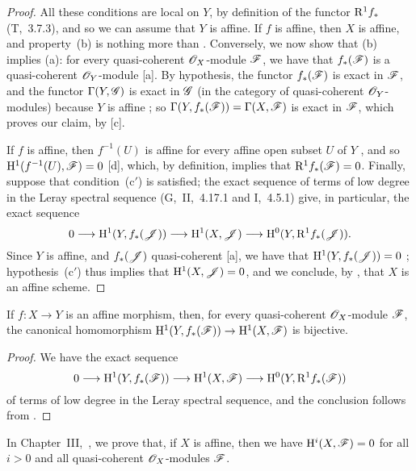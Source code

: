 \begin{proof}
All these conditions are local on $Y$, by definition of the functor $\mathrm{R}^1 f_*$ (T,~3.7.3), and so we can assume that $Y$ is affine.
If $f$ is affine, then $X$ is affine, and property~(b) is nothing more than .
Conversely, we now show that (b) implies (a):
for every quasi-coherent $\mathscr{O}_X$-module $\mathscr{F}$, we have that $f_*(\mathscr{F})$ is a quasi-coherent $\mathscr{O}_Y$-module [a].
By hypothesis, the functor $f_*(\mathscr{F})$ is exact in $\mathscr{F}$, and the functor $\Gamma(Y,\mathscr{G})$ is exact in $\mathscr{G}$ (in the category of quasi-coherent $\mathscr{O}_Y$-modules) because $Y$ is affine ;
so $\Gamma(Y,f_*(\mathscr{F}))=\Gamma(X,\mathscr{F})$ is exact in $\mathscr{F}$, which proves our claim, by [c].

If $f$ is affine, then $f^{-1}(U)$ is affine for every affine open subset $U$ of $Y$ , and so $\mathrm{H}^1(f^{-1}(U),\mathscr{F})=0$ [d], which, by definition, implies that $\mathrm{R}^1 f_*(\mathscr{F})=0$.
Finally, suppose that condition~(c$'$) is satisfied;
the exact sequence of terms of low degree in the Leray spectral sequence (G,~II,~4.17.1 and I,~4.5.1) give, in particular, the exact sequence
\[
  0\to\HH^1(Y,f_*(\sh{J}))\to\HH^1(X,\sh{J})\to\HH^0(Y,\RR^1 f_*(\sh{J})).
\]
Since $Y$ is affine, and $f_*(\mathscr{J})$ quasi-coherent [a], we have that $\mathrm{H}^1(Y,f_*(\mathscr{J}))=0$ ;
hypothesis~(c$'$) thus implies that $\mathrm{H}^1(X,\mathscr{J})=0$, and we conclude, by , that $X$ is an affine scheme.
\end{proof}

\begin{corollary}[5.2.3]
\label{II.5.2.3}
If $f:X\to Y$ is an affine morphism, then, for every quasi-coherent $\mathscr{O}_X$-module $\mathscr{F}$, the canonical homomorphism $\HH^1(Y,f_*(\sh{F}))\to\HH^1(X,\sh{F})$ is bijective.
\end{corollary}

\begin{proof}
We have the exact sequence
\[
  0\to\HH^1(Y,f_*(\sh{F}))\to\HH^1(X,\sh{F})\to\HH^0(Y,\RR^1 f_*(\sh{F}))
\]
of terms of low degree in the Leray spectral sequence, and the conclusion follows from .
\end{proof}

\begin{remark}[5.2.4]
\label{II.5.2.4}
In Chapter~III,~, we prove that, if $X$ is affine, then we have $\mathrm{H}^i(X,\mathscr{F})=0$ for all $i>0$ and all quasi-coherent $\mathscr{O}_X$-modules $\mathscr{F}$.
\end{remark}

